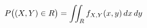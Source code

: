 \documentclass[preview]{standalone}
\begin{document}
\begin{align*}
\special{dvisvgm:raw <g id='unique000'>}P\big((X,Y)\in R\big)=\iint_R f_{X,Y}(x,y)\,dx\,dy\special{dvisvgm:raw </g>}
\end{align*}
\end{document}
